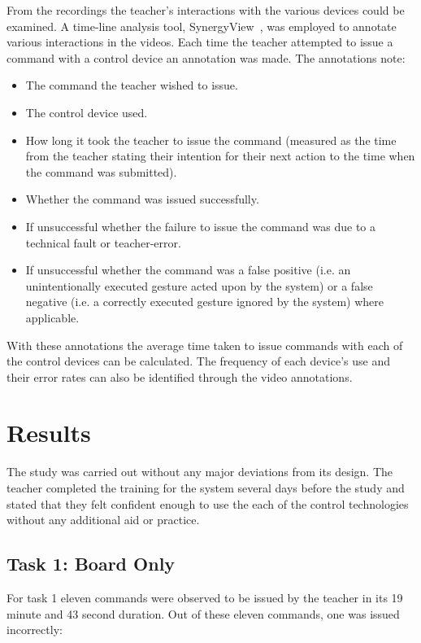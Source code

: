 \documentclass[link]{IWCOMP}
\begin{document}
From the recordings the teacher's interactions with the various devices could be examined.
A time-line analysis tool, SynergyView~\citep{Kyaw2011}, was employed to annotate various interactions in the videos.
Each time the teacher attempted to issue a command with a control device an annotation was made.
The annotations note:
\begin{itemize}
\item The command the teacher wished to issue.
\item The control device used.
\item How long it took the teacher to issue the command (measured as the time from the teacher stating their intention for their next action to the time when the command was submitted).
\item Whether the command was issued successfully.
\item If unsuccessful whether the failure to issue the command was due to a technical fault or teacher-error.
\item If unsuccessful whether the command was a false positive (i.e. an unintentionally executed gesture acted upon by the system) or a false negative (i.e. a correctly executed gesture ignored by the system) where applicable.
\end{itemize}
With these annotations the average time taken to issue commands with each of the control devices can be calculated.
The frequency of each device's use and their error rates can also be identified through the video annotations.

\section{Results}
\label{sec:results}

The study was carried out without any major deviations from its design.
The teacher completed the training for the system several days before the study and stated that they felt confident enough to use the each of the control technologies without any additional aid or practice.

\subsection{Task 1: Board Only}
\label{subsec:resultsTask1}

For task 1 eleven commands were observed to be issued by the teacher in its 19 minute and 43 second duration.
Out of these eleven commands, one was issued incorrectly:
\end{document}
